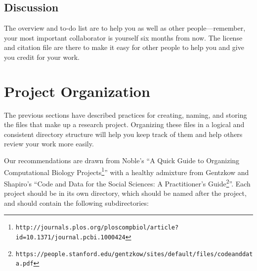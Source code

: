 \documentclass[10pt]{article}
\newcommand{\withurl}[2]{{#1}\footnote{\texttt{#2}}}
\begin{document}
\subsection*{Discussion}

The overview and to-do list are to help you as well as other
people---remember, your most important collaborator is yourself six
months from now. The license and citation file are there to make it easy
for other people to help you and give you credit for your work.

\section{Project Organization}\label{project-organization}

The previous sections have described practices for creating, naming, and
storing the files that make up a research project. Organizing these
files in a logical and consistent directory structure will help you keep
track of them and help others review your work more easily.

Our recommendations are drawn from Noble's ``\withurl{A Quick Guide to
  Organizing Computational Biology
  Projects}{http://journals.plos.org/ploscompbiol/article?id=10.1371/journal.pcbi.1000424}''
with a healthy admixture from Gentzkow and Shapiro's ``\withurl{Code and
  Data for the Social Sciences: A Practitioner's
  Guide}{https://people.stanford.edu/gentzkow/sites/default/files/codeanddata.pdf}''. Each
project should be in its own directory, which should be named after
the project, and should contain the following subdirectories:
\end{document}
